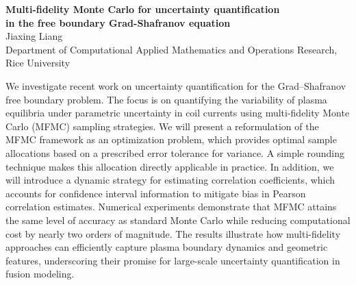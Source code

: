 \begin{center}
{\bf Multi-fidelity Monte Carlo for uncertainty quantification \\ in the free boundary Grad-Shafranov equation} \\[1ex]

Jiaxing Liang   \\[1ex]
{\small Department of Computational Applied Mathematics and Operations Research, Rice University}
\end{center}

\noindent
We investigate recent work on uncertainty quantification for the Grad–Shafranov free boundary problem. The focus is on quantifying the variability of plasma equilibria under parametric uncertainty in coil currents using multi-fidelity Monte Carlo (MFMC) sampling strategies. We will present a reformulation of the MFMC framework as an optimization problem, which provides optimal sample allocations based on a prescribed error tolerance for variance. A simple rounding technique makes this allocation directly applicable in practice. In addition, we will introduce a dynamic strategy for estimating correlation coefficients, which accounts for confidence interval information to mitigate bias in Pearson correlation estimates. Numerical experiments demonstrate that MFMC attains the same level of accuracy as standard Monte Carlo while reducing computational cost by nearly two orders of magnitude. The results illustrate how multi-fidelity approaches can efficiently capture plasma boundary dynamics and geometric features, underscoring their promise for large-scale uncertainty quantification in fusion modeling.
